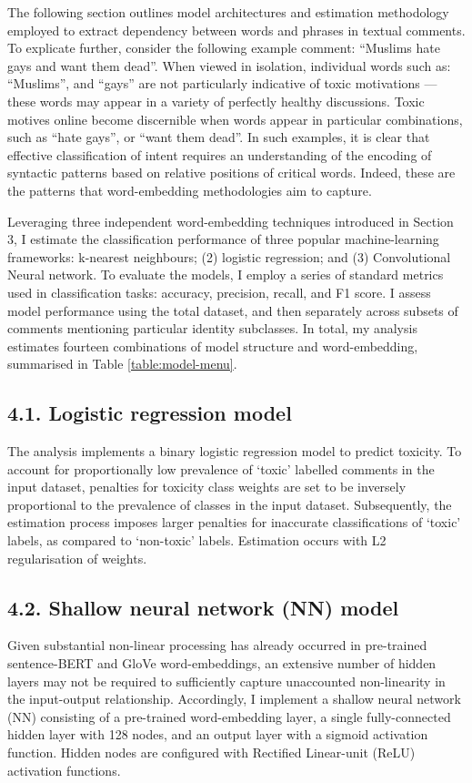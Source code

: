 
The following section outlines model architectures and estimation methodology employed to extract dependency between words and phrases in textual comments. To explicate further, consider the following example comment: ``Muslims hate gays and want them dead''. When viewed in isolation, individual words such as: ``Muslims'', and ``gays'' are not particularly indicative of toxic motivations --- these words may appear in a variety of perfectly healthy discussions. Toxic motives online become discernible when words appear in particular combinations, such as ``hate gays'', or ``want them dead''. In such examples, it is clear that effective classification of intent requires an understanding of the encoding of syntactic patterns based on relative positions of critical words. Indeed, these are the patterns that word-embedding methodologies aim to capture.

Leveraging three independent word-embedding techniques introduced in Section 3, I estimate the classification performance of three popular machine-learning frameworks: k-nearest neighbours; (2) logistic regression; and (3) Convolutional Neural network. To evaluate the models, I employ a series of standard metrics used in classification tasks: accuracy, precision, recall, and F1 score. I assess model performance using the total dataset, and then separately across subsets of comments mentioning particular identity subclasses. In total, my analysis estimates fourteen combinations of model structure and word-embedding, summarised in Table \ref{table:model-menu}.

\subsection*{4.1. Logistic regression model}
The analysis implements a binary logistic regression model to predict toxicity. To account for proportionally low prevalence of `toxic' labelled comments in the input dataset, penalties for toxicity class weights are set to be inversely proportional to the prevalence of classes in the input dataset. Subsequently, the estimation process imposes larger penalties for inaccurate classifications of `toxic' labels, as compared to `non-toxic' labels. Estimation occurs with L2 regularisation of weights.

\subsection*{4.2. Shallow neural network (NN) model}
Given substantial non-linear processing has already occurred in pre-trained sentence-BERT and GloVe word-embeddings, an extensive number of hidden layers may not be required to sufficiently capture unaccounted non-linearity in the input-output relationship. Accordingly, I implement a shallow neural network (NN) consisting of a pre-trained word-embedding  layer, a single fully-connected hidden layer with 128 nodes, and an output layer with a sigmoid activation function. Hidden nodes are configured with Rectified Linear-unit (ReLU) activation functions.

